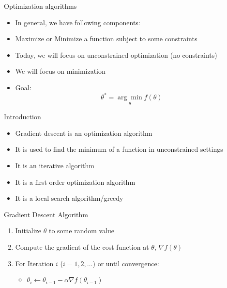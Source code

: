 \documentclass[usenames,dvipsnames]{beamer}
\begin{document}
  \begin{frame}{Optimization algorithms}
    \begin{itemize}[<+->]
        \item In general, we have following components:
        \item Maximize or Minimize a function subject to some constraints
        \item Today, we will focus on unconstrained optimization (no constraints)
        \item We will focus on minimization
        \item Goal: 
        \begin{equation}
            \theta^* = \underset{\theta}{\arg\min}  f(\theta)
        \end{equation}
    \end{itemize}
    
  \end{frame}
  
\begin{frame}{Introduction}
    \begin{itemize}[<+->]
    \item Gradient descent is an optimization algorithm
    \item It is used to find the minimum of a function in unconstrained settings
    \item It is an iterative algorithm
    \item It is a first order optimization algorithm
    \item It is a local search algorithm/greedy
    \end{itemize}
\end{frame}



\begin{frame}{Gradient Descent Algorithm} 
    \begin{enumerate}[<+->]
        \item Initialize $\theta$ to some random value
        \item Compute the gradient of the cost function at $\theta$, $\nabla f(\theta)$
        \item For Iteration $i$ ($i = 1,2,\ldots$) or until convergence:
        \begin{itemize}
            \item $\theta_{i} \gets   \theta_{i-1} - \alpha \nabla f(\theta_{i-1})$
        \end{itemize}
    \end{enumerate}
    
\end{frame}
    
\end{document}
